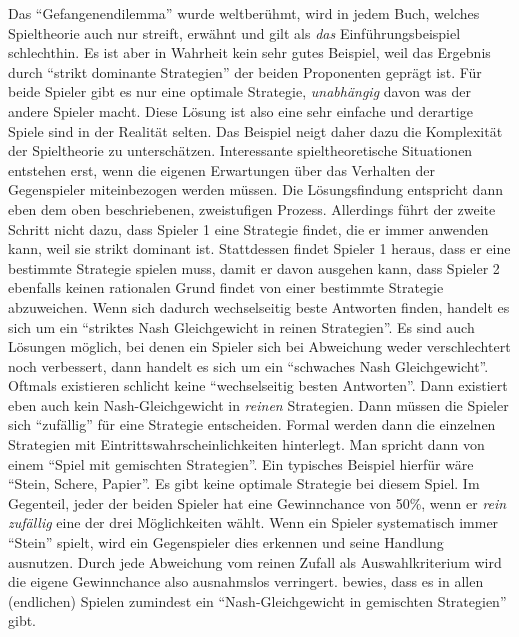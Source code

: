 Das "`Gefangenendilemma"' wurde weltberühmt, wird in jedem Buch, welches Spieltheorie auch nur streift, erwähnt und gilt als \textit{das} Einführungsbeispiel schlechthin. Es ist aber in Wahrheit kein sehr gutes Beispiel, weil das Ergebnis durch "`strikt dominante Strategien"' der beiden Proponenten geprägt ist. Für beide Spieler gibt es nur eine optimale Strategie, \textit{unabhängig} davon was der andere Spieler macht. Diese Lösung ist also eine sehr einfache und derartige Spiele sind in der Realität selten. Das Beispiel neigt daher dazu die Komplexität der Spieltheorie zu unterschätzen. Interessante spieltheoretische Situationen entstehen erst, wenn die eigenen Erwartungen über das Verhalten der Gegenspieler miteinbezogen werden müssen. Die Lösungsfindung entspricht dann eben dem oben beschriebenen, zweistufigen Prozess. Allerdings führt der zweite Schritt nicht dazu, dass Spieler 1 eine Strategie findet, die er immer anwenden kann, weil sie strikt dominant ist. Stattdessen findet Spieler 1 heraus, dass er eine bestimmte Strategie spielen muss, damit er davon ausgehen kann, dass Spieler 2 ebenfalls keinen rationalen Grund findet von einer bestimmte Strategie abzuweichen. Wenn sich dadurch wechselseitig beste Antworten finden, handelt es sich um ein "`striktes Nash Gleichgewicht in reinen Strategien"'. Es sind auch Lösungen möglich, bei denen ein Spieler sich bei Abweichung weder verschlechtert noch verbessert, dann handelt es sich um ein "`schwaches Nash Gleichgewicht"'. Oftmals existieren schlicht keine "`wechselseitig besten Antworten"'. Dann existiert eben auch kein Nash-Gleichgewicht in \textit{reinen} Strategien. Dann müssen die Spieler sich "`zufällig"' für eine Strategie entscheiden. Formal werden dann die einzelnen Strategien mit Eintrittswahrscheinlichkeiten hinterlegt. Man spricht dann von einem "`Spiel mit gemischten Strategien"'. Ein typisches Beispiel hierfür wäre "`Stein, Schere, Papier"'. Es gibt keine optimale Strategie bei diesem Spiel. Im Gegenteil, jeder der beiden Spieler hat eine Gewinnchance von 50\%, wenn er \textit{rein zufällig} eine der drei Möglichkeiten wählt. Wenn ein Spieler systematisch immer "`Stein"' spielt, wird ein Gegenspieler dies erkennen und seine Handlung ausnutzen. Durch jede Abweichung vom reinen Zufall als Auswahlkriterium wird die eigene Gewinnchance also ausnahmslos verringert. \textcite{Nash1951} bewies, dass es in allen (endlichen) Spielen zumindest ein "`Nash-Gleichgewicht in gemischten Strategien"' gibt.

